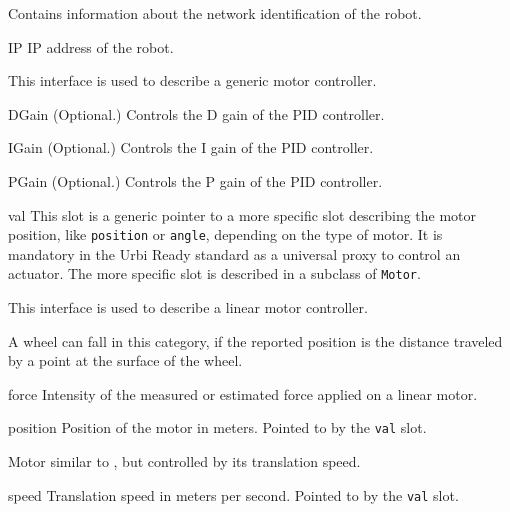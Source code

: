 
Contains information about the network identification of the robot.

\begin{urbiscriptapi}
\item[IP] IP address of the robot.
\end{urbiscriptapi}


This interface is used to describe a generic motor controller.

\begin{urbiscriptapi}
\item[DGain]{} (Optional.) Controls the D gain of the PID controller.


\item[IGain]{} (Optional.) Controls the I gain of the PID controller.


\item[PGain]{} (Optional.) Controls the P gain of the PID controller.


\item[val] This slot is a generic pointer to a more specific slot describing
  the motor position, like \lstinline{position} or \lstinline{angle},
  depending on the type of motor. It is mandatory in the Urbi Ready standard
  as a universal proxy to control an actuator. The more specific slot is
  described in a subclass of \lstinline{Motor}.
\end{urbiscriptapi}



This interface is used to describe a linear motor controller.

A wheel can fall in this category, if the reported position is the distance
traveled by a point at the surface of the wheel.

\begin{urbiscriptapi}
\item[force] Intensity of the measured or estimated force applied on a
  linear motor.


\item[position] Position of the motor in meters.  Pointed to by the
  \lstinline{val} slot.
\end{urbiscriptapi}


Motor similar to , but controlled by its translation
speed.

\begin{urbiscriptapi}
\item[speed] Translation speed in meters per second. Pointed to by the
  \lstinline{val} slot.
\end{urbiscriptapi}


